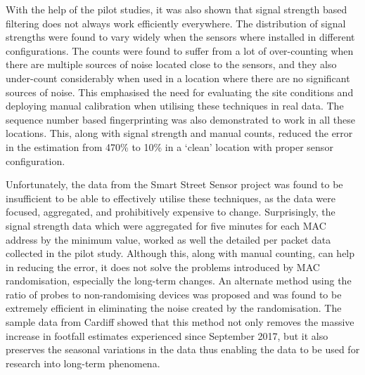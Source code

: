 With the help of the pilot studies, it was also shown that signal strength based filtering does not always work efficiently everywhere.
The distribution of signal strengths were found to vary widely when  the sensors where installed in different configurations.
The counts were found to suffer from a lot of over-counting when there are multiple sources of noise located close to the sensors, and they also under-count considerably when used in a location where there are no significant sources of noise.
This emphasised the need for evaluating the site conditions and deploying manual calibration when utilising these techniques in real data.
The sequence number based fingerprinting was also demonstrated to work in all these locations.
This, along with signal strength and manual counts, reduced the error in the estimation from 470\% to 10\% in a ‘clean’ location with proper sensor configuration.

Unfortunately, the data from the Smart Street Sensor project was found to be insufficient to be able to effectively utilise these techniques, as the data were focused, aggregated, and prohibitively expensive to change.
Surprisingly, the signal strength data which were aggregated for five minutes for each MAC address by the minimum value, worked as well the detailed per packet data collected in the pilot study.
Although this, along with manual counting, can help in reducing the error, it does not solve the problems introduced by MAC randomisation, especially the long-term changes.
An alternate method using the ratio of probes to non-randomising devices was proposed and was found to be extremely efficient in eliminating the noise created by the randomisation.
The sample data from Cardiff showed that this method not only removes the massive increase in footfall estimates experienced since September 2017, but it also preserves the seasonal variations in the data thus enabling the data to be used for research into long-term phenomena.
